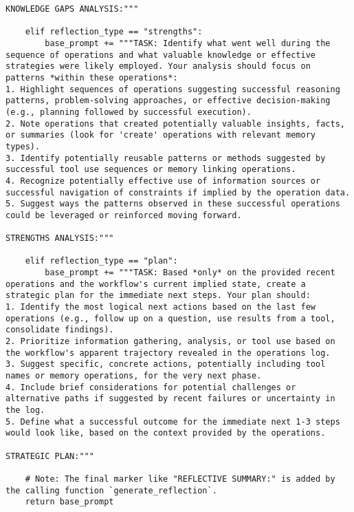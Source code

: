 \documentclass[12pt,a4paper]{article}
\begin{document}
\begin{pageablecode}
\begin{verbatim}
KNOWLEDGE GAPS ANALYSIS:"""

    elif reflection_type == "strengths":
        base_prompt += """TASK: Identify what went well during the sequence of operations and what valuable knowledge or effective strategies were likely employed. Your analysis should focus on patterns *within these operations*:
1. Highlight sequences of operations suggesting successful reasoning patterns, problem-solving approaches, or effective decision-making (e.g., planning followed by successful execution).
2. Note operations that created potentially valuable insights, facts, or summaries (look for 'create' operations with relevant memory types).
3. Identify potentially reusable patterns or methods suggested by successful tool use sequences or memory linking operations.
4. Recognize potentially effective use of information sources or successful navigation of constraints if implied by the operation data.
5. Suggest ways the patterns observed in these successful operations could be leveraged or reinforced moving forward.

STRENGTHS ANALYSIS:"""

    elif reflection_type == "plan":
        base_prompt += """TASK: Based *only* on the provided recent operations and the workflow's current implied state, create a strategic plan for the immediate next steps. Your plan should:
1. Identify the most logical next actions based on the last few operations (e.g., follow up on a question, use results from a tool, consolidate findings).
2. Prioritize information gathering, analysis, or tool use based on the workflow's apparent trajectory revealed in the operations log.
3. Suggest specific, concrete actions, potentially including tool names or memory operations, for the very next phase.
4. Include brief considerations for potential challenges or alternative paths if suggested by recent failures or uncertainty in the log.
5. Define what a successful outcome for the immediate next 1-3 steps would look like, based on the context provided by the operations.

STRATEGIC PLAN:"""

    # Note: The final marker like "REFLECTIVE SUMMARY:" is added by the calling function `generate_reflection`.
    return base_prompt



\end{verbatim}
\end{pageablecode}
\end{document}
